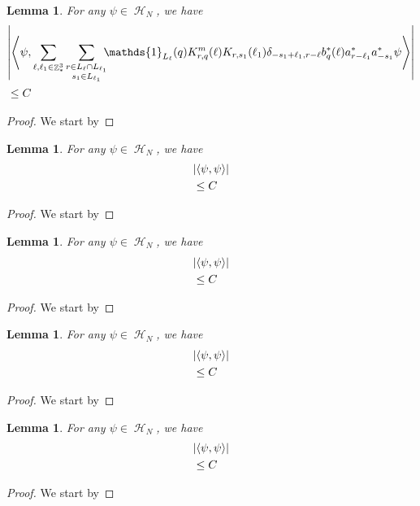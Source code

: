 \documentclass[sn-mathphys, Numbered ,a4paper]{sn-jnl}%
\DeclareMathOperator{\Z}{\mathbb{Z}}
\DeclareMathOperator{\HH}{\mathcal{H}}
\newcommand{\eva}[1]{\left\langle #1 \right\rangle}
\theoremstyle{plain}
\newtheorem{lemma}[theorem]{Lemma}
\theoremstyle{definition}
\theoremstyle{remark}
\theoremstyle{plain}
\theoremstyle{definition}
\theoremstyle{remark}
\begin{document}
\begin{lemma}
    For any $\psi \in \HH_N$, we have
    \begin{align}
        &\abs{\eva{\psi,  \sum\limits_{\ell, \ell_1\in \Z^3_*}\sum\limits_{\substack{r \in L_{\ell}\cap  L_{\ell_1}\\s_1\in L_{\ell_1}}}\!\!\!\mathds{1}_{L_\ell}      (q) K^{m}_{r,q}(\ell)K_{r,s_1}(\ell_1)\delta_{-s_1+\ell_1,r-\ell} b^*_{q}(\ell) a^*_{r-\ell_1}a^*_{-s_1} \psi}} \nonumber\\ &\leq C
    \end{align}
\end{lemma}
\begin{proof}
    We start by
\end{proof}

\begin{lemma}
    For any $\psi \in \HH_N$, we have
    \begin{align}
        &\abs{\eva{\psi,   \psi}}\nonumber\\&\leq C
    \end{align}
\end{lemma}
\begin{proof}
    We start by
\end{proof}

\begin{lemma}
    For any $\psi \in \HH_N$, we have
    \begin{align}
        &\abs{\eva{\psi,   \psi}}\nonumber\\&\leq C
    \end{align}
\end{lemma}
\begin{proof}
    We start by
\end{proof}

\begin{lemma}
    For any $\psi \in \HH_N$, we have
    \begin{align}
        &\abs{\eva{\psi,   \psi}}\nonumber\\&\leq C
    \end{align}
\end{lemma}
\begin{proof}
    We start by
\end{proof}

\begin{lemma}
    For any $\psi \in \HH_N$, we have
    \begin{align}
        &\abs{\eva{\psi,   \psi}}\nonumber\\&\leq C
    \end{align}
\end{lemma}
\begin{proof}
    We start by
\end{proof}
\end{document}
